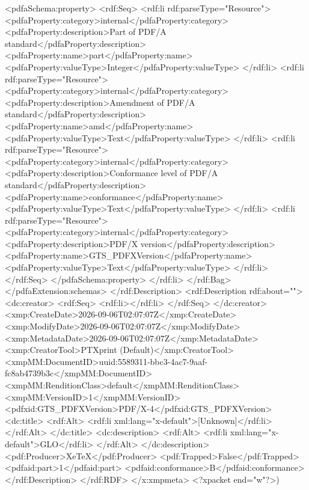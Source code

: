 {              <pdfaSchema:property>
                <rdf:Seq>
                  <rdf:li rdf:parseType="Resource">
                    <pdfaProperty:category>internal</pdfaProperty:category>
                    <pdfaProperty:description>Part of PDF/A standard</pdfaProperty:description>
                    <pdfaProperty:name>part</pdfaProperty:name>
                    <pdfaProperty:valueType>Integer</pdfaProperty:valueType>
                  </rdf:li>
                  <rdf:li rdf:parseType="Resource">
                    <pdfaProperty:category>internal</pdfaProperty:category>
                    <pdfaProperty:description>Amendment of PDF/A standard</pdfaProperty:description>
                    <pdfaProperty:name>amd</pdfaProperty:name>
                    <pdfaProperty:valueType>Text</pdfaProperty:valueType>
                  </rdf:li>
                  <rdf:li rdf:parseType="Resource">
                    <pdfaProperty:category>internal</pdfaProperty:category>
                    <pdfaProperty:description>Conformance level of PDF/A standard</pdfaProperty:description>
                    <pdfaProperty:name>conformance</pdfaProperty:name>
                    <pdfaProperty:valueType>Text</pdfaProperty:valueType>
                  </rdf:li>
                  <rdf:li rdf:parseType="Resource">
                    <pdfaProperty:category>internal</pdfaProperty:category>
                    <pdfaProperty:description>PDF/X version</pdfaProperty:description>
                    <pdfaProperty:name>GTS_PDFXVersion</pdfaProperty:name>
                    <pdfaProperty:valueType>Text</pdfaProperty:valueType>
                  </rdf:li>
                </rdf:Seq>
              </pdfaSchema:property>
            </rdf:li>
          </rdf:Bag>
        </pdfaExtension:schemas>
      </rdf:Description>
      <rdf:Description rdf:about="">
        <dc:creator>
          <rdf:Seq>
            <rdf:li></rdf:li>
          </rdf:Seq>
        </dc:creator>
        <xmp:CreateDate>2026-09-06T02:07:07Z</xmp:CreateDate>
        <xmp:ModifyDate>2026-09-06T02:07:07Z</xmp:ModifyDate>
        <xmp:MetadataDate>2026-09-06T02:07:07Z</xmp:MetadataDate>
        <xmp:CreatorTool>PTXprint (Default)</xmp:CreatorTool>
        <xmpMM:DocumentID>uuid:5589311-bbc3-4ac7-9aaf-fc8ab4739b3c</xmpMM:DocumentID>
        <xmpMM:RenditionClass>default</xmpMM:RenditionClass>
        <xmpMM:VersionID>1</xmpMM:VersionID>
        <pdfxid:GTS_PDFXVersion>PDF/X-4</pdfxid:GTS_PDFXVersion>
        <dc:title>
          <rdf:Alt>
            <rdf:li xml:lang="x-default">[Unknown]</rdf:li>
          </rdf:Alt>
        </dc:title>
        <dc:description>
          <rdf:Alt>
            <rdf:li xml:lang="x-default">GLO</rdf:li>
          </rdf:Alt>
        </dc:description>
        <pdf:Producer>XeTeX</pdf:Producer>
        <pdf:Trapped>False</pdf:Trapped>
      <pdfaid:part>1</pdfaid:part>
      <pdfaid:conformance>B</pdfaid:conformance>
      </rdf:Description>
  </rdf:RDF>
</x:xmpmeta>
<?xpacket end="w"?>)}
